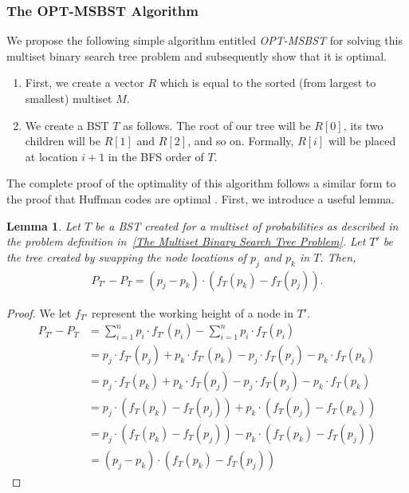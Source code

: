 \documentclass[]{beamer}
\theoremstyle{plain}
\newtheorem{lem}[thm]{Lemma}
\begin{document}
\begin{frame} \frametitle{The OPT-MSBST Algorithm}\label{OPT-MSBST}

We propose the following simple algorithm entitled \textit{OPT-MSBST} for solving this multiset binary search tree problem and subsequently show that it is optimal.

\begin{enumerate}
\item First, we create a vector $R$ which is equal to the sorted (from largest to smallest) multiset $M$.

\item We create a BST $T$ as follows. The root of our tree will be $R[0]$, its two children will be $R[1]$ and $R[2]$, and so on. Formally, $R[i]$ will be placed at location $i+1$ in the BFS order of $T$.
\end{enumerate}

The complete proof of the optimality of this algorithm follows a similar form to the proof that Huffman codes are optimal \cite{huffman1952method}. First, we introduce a useful lemma.

\begin{lem}\label{MS Swap Lemma}
Let $T$ be a BST created for a multiset of probabilities as described in the problem definition in~\ref{The Multiset Binary Search Tree Problem}. Let $T'$ be the tree created by swapping the node locations of $p_j$ and $p_k$ in $T$. Then,
\begin{align*}
P_{T'}-P_T = (p_j - p_k)\cdot (f_T(p_k)-f_T(p_j)).
\end{align*}
\end{lem}

\begin{proof}
We let $f_{T'}$ represent the working height of a node in $T'$.
\begin{align*}
P_{T'}-P_T &= \sum_{i=1}^{n} p_i\cdot f_{T'}(p_i) - \sum_{i=1}^{n} p_i\cdot f_T(p_i) \\
&= p_j\cdot f_{T'}(p_j)+p_k\cdot f_{T'}(p_k) - p_j\cdot f_T(p_j) - p_k\cdot f_T(p_k)\\
&= p_j\cdot f_T(p_k)+p_k\cdot f_T(p_j) - p_j\cdot f_T(p_j) - p_k\cdot f_T(p_k)\\
&= p_j\cdot (f_T(p_k)-f_T(p_j)) + p_k \cdot (f_T(p_j) - f_T(p_k))\\
&= p_j\cdot (f_T(p_k)-f_T(p_j)) - p_k \cdot (f_T(p_k)-f_T(p_j))\\
&= (p_j - p_k)\cdot (f_T(p_k)-f_T(p_j))
\end{align*}


\end{proof}
\end{frame}
\end{document}
